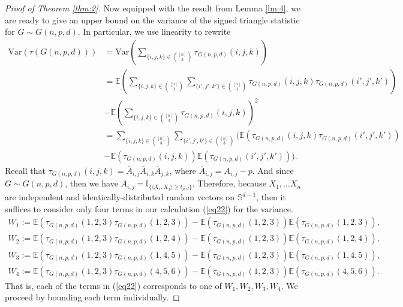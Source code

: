 \documentclass{article}
\begin{document}
\begin{proof}[Proof of Theorem \ref{thm:2}]
Now equipped with the result from Lemma \ref{lm:4}, we are ready to give an upper bound on the variance of the signed triangle statistic for $G \sim G(n, p, d)$. In particular, we use linearity to rewrite
\begin{align}
    \text{Var}(\tau(G(n,p,d))) &= \text{Var} \left(\sum_{\{i, j, k\} \in \binom{[n]}{3}} \tau_{G(n,p,d)}(i, j, k) \right) \nonumber\\
    &= \mathbb{E} \left( \sum_{\{i, j, k\} \in \binom{[n]}{3}} \sum_{\{i', j', k'\} \in \binom{[n]}{3}} \tau_{G(n,p,d)}(i, j, k) \tau_{G(n,p,d)}(i', j', k') \right) \nonumber\\
    &- \mathbb{E} \left( \sum_{\{i, j, k\} \in \binom{[n]}{3}} \tau_{G(n,p,d)}(i, j, k) \right)^2 \nonumber\\
    &= \sum_{\{i, j, k\} \in \binom{[n]}{3}} \sum_{\{i', j', k'\} \in \binom{[n]}{3}} \bigg( \mathbb{E} \left(\tau_{G(n,p,d)}(i, j, k) \tau_{G(n,p,d)}(i', j', k') \right) \nonumber\\
    &- \mathbb{E} \left(\tau_{G(n,p,d)}(i, j, k) \right) \mathbb{E} \left( \tau_{G(n,p,d)}(i', j', k') \right) \bigg)\label{eq22}.
\end{align}
Recall that $\tau_{G(n,p,d)}(i, j, k) = \overline{A}_{i,j}\overline{A}_{i,k}\overline{A}_{j,k}$, where $\overline{A}_{i,j} = A_{i,j} - p$. And since $G \sim G(n, p,d)$, then we have $A_{i,j} = \mathbb{I}_{\{ \langle X_i, X_j \rangle \geq t_{p,d}\}}$. Therefore, because $X_1, \ldots X_n$ are independent and identically-distributed random vectors on $\mathbb{S}^{d-1}$, then it suffices to consider only four terms in our calculation (\ref{eq22}) for the variance.
\begin{align*}
    W_1 := \mathbb{E}\left(\tau_{G(n,p,d)}(1,2,3)\tau_{G(n,p,d)}(1,2,3)\right) - \mathbb{E}\left(\tau_{G(n,p,d)}(1,2,3)\right)\mathbb{E}\left(\tau_{G(n,p,d)}(1,2,3)\right),\\
    W_2 := \mathbb{E}\left(\tau_{G(n,p,d)}(1,2,3)\tau_{G(n,p,d)}(1,2,4)\right) - \mathbb{E}\left(\tau_{G(n,p,d)}(1,2,3)\right)\mathbb{E}\left(\tau_{G(n,p,d)}(1,2,4)\right),\\
    W_3 := \mathbb{E}\left(\tau_{G(n,p,d)}(1,2,3)\tau_{G(n,p,d)}(1,4,5)\right) - \mathbb{E}\left(\tau_{G(n,p,d)}(1,2,3)\right)\mathbb{E}\left(\tau_{G(n,p,d)}(1,4,5)\right),\\
    W_4 := \mathbb{E}\left(\tau_{G(n,p,d)}(1,2,3)\tau_{G(n,p,d)}(4,5,6)\right) - \mathbb{E}\left(\tau_{G(n,p,d)}(1,2,3)\right)\mathbb{E}\left(\tau_{G(n,p,d)}(4,5,6)\right).
\end{align*}
That is, each of the terms in (\ref{eq22}) corresponds to one of $W_1, W_2, W_3, W_4$. We proceed by bounding each term individually.


\end{proof}
\end{document}
